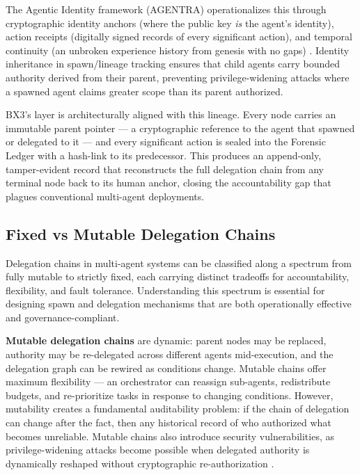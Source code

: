 The Agentic Identity framework (AGENTRA) operationalizes this through cryptographic identity anchors (where the public key \emph{is} the agent's identity), action receipts (digitally signed records of every significant action), and temporal continuity (an unbroken experience history from genesis with no gaps) \cite{agenticidentity2025}. Identity inheritance in spawn/lineage tracking ensures that child agents carry bounded authority derived from their parent, preventing privilege-widening attacks where a spawned agent claims greater scope than its parent authorized.

BX3's \fact{} layer is architecturally aligned with this lineage. Every node carries an immutable parent pointer — a cryptographic reference to the agent that spawned or delegated to it — and every significant action is sealed into the Forensic Ledger with a hash-link to its predecessor. This produces an append-only, tamper-evident record that reconstructs the full delegation chain from any terminal node back to its human anchor, closing the accountability gap that plagues conventional multi-agent deployments.

\subsection{Fixed vs Mutable Delegation Chains}
\label{sec:fixed-vs-mutable}

Delegation chains in multi-agent systems can be classified along a spectrum from fully mutable to strictly fixed, each carrying distinct tradeoffs for accountability, flexibility, and fault tolerance. Understanding this spectrum is essential for designing spawn and delegation mechanisms that are both operationally effective and governance-compliant.

\textbf{Mutable delegation chains} are dynamic: parent nodes may be replaced, authority may be re-delegated across different agents mid-execution, and the delegation graph can be rewired as conditions change. Mutable chains offer maximum flexibility — an orchestrator can reassign sub-agents, redistribute budgets, and re-prioritize tasks in response to changing conditions. However, mutability creates a fundamental auditability problem: if the chain of delegation can change after the fact, then any historical record of who authorized what becomes unreliable. Mutable chains also introduce security vulnerabilities, as privilege-widening attacks become possible when delegated authority is dynamically reshaped without cryptographic re-authorization \cite{agenticcontrolplane2025}.

